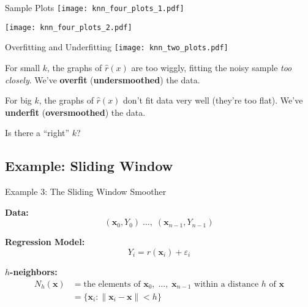 \documentclass[xcolor={dvipsnames}]{beamer}
\renewcommand{\epsilon}{\varepsilon}
\renewcommand{\hat}{\widehat}
\newcommand{\vx}{\mathbf{x}}
\begin{document}
\begin{frame}
\end{frame}


\begin{frame}{Sample Plots}
    \texttt{[image: knn\_four\_plots\_1.pdf]}
\end{frame}

\begin{frame}
    \texttt{[image: knn\_four\_plots\_2.pdf]}
\end{frame}

\begin{frame}{Overfitting and Underfitting}
    \setlength\parskip{1em}
    \texttt{[image: knn\_two\_plots.pdf]}

    For small $k$, the graphs of $\hat r(x)$ are too wiggly,
    fitting the noisy sample \emph{too closely}.
    We've \textbf{overfit} (\textbf{undersmoothed}) the data.


    For big $k$, the graphs of $\hat{r}(x)$ don't fit data very well (they're too flat).
    We've \textbf{underfit} (\textbf{oversmoothed}) the data.

    Is there a ``right'' $k$?
\end{frame}

\subsection{Example: Sliding Window}
\begin{frame}{Example 3: The Sliding Window Smoother}
    \setlength\parskip{0.75em}

    \textbf{Data:} $$(\vx_0,Y_0)\;\ldots,\;(\vx_{n-1}, Y_{n-1})$$
    
    \textbf{Regression Model:}
    \[
        Y_i = r(\vx_i) + \epsilon_i
    \]

    \textbf{$h$-neighbors:} 
    \begin{align*}
        N_h(\vx) &= \text{the elements of $\vx_0,\;\ldots,\;\vx_{n-1}$ within a distance $h$ of $\vx$}\\[1ex]
        &= \{\vx_i : \|\vx_i - \vx\| < h\}
    \end{align*}

\end{frame}
        
\end{document}
